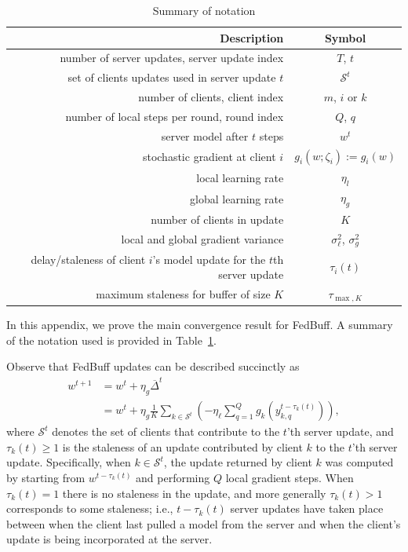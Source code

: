 \documentclass[twoside]{article}
\newcommand{\calS}{\mathcal{S}}
\newcommand{\algname}{{FedBuff}\xspace}
\begin{document}
\begin{table}[t]
    \caption{Summary of notation}
    \label{tab:notation}
\begin{center}
\begin{tabular}{r c} \toprule
Description & Symbol \\ \midrule
number of server updates, server update index &  $T$, $t$ \\
set of clients updates used in server update $t$ & $\calS^t$ \\
number of clients, client index & $m$, $i$ or $k$ \\
number of local steps per round, round index & $Q$, $q$ \\
server model after $t$ steps & $w^t$ \\
stochastic gradient at client $i$ & $g_i(w; \zeta_i):=g_i(w)$ \\
local learning rate &  $\eta_l$ \\
global learning rate  & $\eta_g$ \\
number of clients in update & $K$ \\
local and global gradient variance & $\sigma_{\ell}^2$, $\sigma_g^2$\\
delay/staleness of client $i$'s model update for the $t$th server update & $\tau_i(t)$ \\
maximum staleness for buffer of size $K$ & $\tau_{\max, K}$ \\
\bottomrule
\end{tabular}
\end{center}
\end{table}

In this appendix, we prove the main convergence result for \algname{}. A summary of the notation used is provided in Table~\ref{tab:notation}.

Observe that \algname{} updates can be described succinctly as
\begin{align*}
w^{t+1} &= w^t + \eta_g \overline{\Delta}^t \\
&= w^t + \eta_g \frac{1}{K} \sum_{k \in \calS^t} \left(- \eta_\ell \sum_{q=1}^Q g_k(y_{k,q}^{t - \tau_k(t)}) \right),
\end{align*}
where $\calS^t$ denotes the set of clients that contribute to the $t$'th server update, and $\tau_k(t) \ge 1$ is the staleness of an update contributed by client $k$ to the $t$'th server update. Specifically, when $k \in \calS^t$, the update returned by client $k$ was computed by starting from $w^{t-\tau_k(t)}$ and performing $Q$ local gradient steps. When $\tau_k(t) = 1$ there is no staleness in the update, and more generally $\tau_k(t) > 1$ corresponds to some staleness; i.e., $t - \tau_k(t)$ server updates have taken place between when the client last pulled a model from the server and when the client's update is being incorporated at the server.
\end{document}
